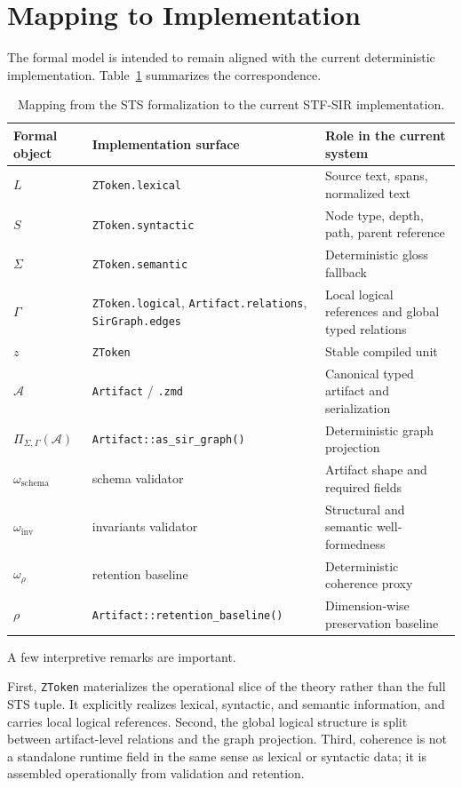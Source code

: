 \documentclass{article}
\newcommand{\STF}{{\normalfont\textsc{STF}}}
\newcommand{\SIR}{{\normalfont\textsc{SIR}}}
\newcommand{\STS}{{\normalfont\textsc{STS}}}
\begin{document}
\section{Mapping to Implementation}

The formal model is intended to remain aligned with the current deterministic implementation. Table~\ref{tab:mapping} summarizes the correspondence.

\begin{table}[t]
\centering
\begin{tabular}{p{} p{} p{}}
\hline
Formal object & Implementation surface & Role in the current system \\
\hline
\(L\) & \texttt{ZToken.lexical} & Source text, spans, normalized text \\
\(S\) & \texttt{ZToken.syntactic} & Node type, depth, path, parent reference \\
\(\Sigma\) & \texttt{ZToken.semantic} & Deterministic gloss fallback \\
\(\Gamma\) & \texttt{ZToken.logical}, \texttt{Artifact.relations}, \texttt{SirGraph.edges} & Local logical references and global typed relations \\
\(z\) & \texttt{ZToken} & Stable compiled unit \\
\(\mathcal{A}\) & \texttt{Artifact} / \texttt{.zmd} & Canonical typed artifact and serialization \\
\(\Pi_{\Sigma,\Gamma}(\mathcal{A})\) & \texttt{Artifact::as\_sir\_graph()} & Deterministic graph projection \\
\(\omega_{\mathrm{schema}}\) & schema validator & Artifact shape and required fields \\
\(\omega_{\mathrm{inv}}\) & invariants validator & Structural and semantic well-formedness \\
\(\omega_{\rho}\) & retention baseline & Deterministic coherence proxy \\
\(\rho\) & \texttt{Artifact::retention\_baseline()} & Dimension-wise preservation baseline \\
\hline
\end{tabular}
\caption{Mapping from the \STS{} formalization to the current \STF{}-\SIR{} implementation.}
\label{tab:mapping}
\end{table}

A few interpretive remarks are important.

First, \texttt{ZToken} materializes the operational slice of the theory rather than the full \STS{} tuple. It explicitly realizes lexical, syntactic, and semantic information, and carries local logical references. Second, the global logical structure is split between artifact-level relations and the graph projection. Third, coherence is not a standalone runtime field in the same sense as lexical or syntactic data; it is assembled operationally from validation and retention.
\end{document}
